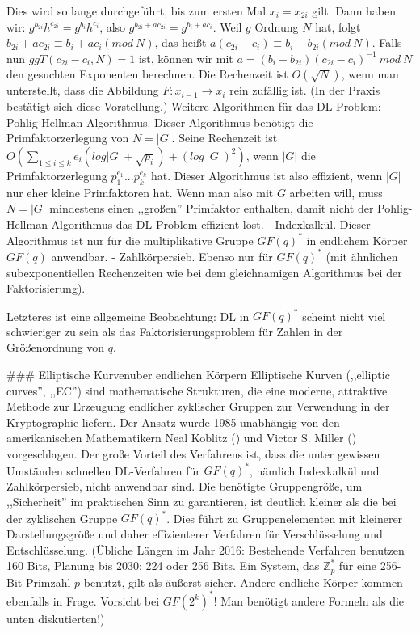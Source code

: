 \documentclass[a4paper]{article}
\begin{document}
\begin{multicols}{3}
{{{{Dies wird so lange durchgeführt, bis zum ersten Mal $x_i=x_{2i}$ gilt. Dann haben wir: $g^{b_{2i}} h^{c_{2i}}=g^{b_i} h^{c_i}$, also $g^{b_{2i}+ac_{2i}}=g^{b_i+ac_i}$. Weil $g$ Ordnung $N$ hat, folgt $b_{2i} +ac_{2i}\equiv b_i+ac_i (mod\ N)$, das heißt $a(c_{2i}-c_i)\equiv b_i-b_{2i} (mod\ N)$.
Falls nun $ggT(c_{2i}-c_i,N) = 1$ ist, können wir mit $a= (b_i-b_{2i})(c_{2i}-c_i)^{-1}\ mod\ N$ den gesuchten Exponenten berechnen.
Die Rechenzeit ist $O(\sqrt{N})$, wenn man unterstellt, dass die Abbildung $F:x_{i-1}\rightarrow x_i$ rein zufällig ist. (In der Praxis bestätigt sich diese Vorstellung.) 
Weitere Algorithmen für das DL-Problem:
- Pohlig-Hellman-Algorithmus. Dieser Algorithmus benötigt die Primfaktorzerlegung von $N=|G|$. Seine Rechenzeit ist $O(\sum_{1 \leq i\leq k} e_i(log|G|+\sqrt{p_i}) + (log\ |G|)^2)$, wenn $|G|$ die Primfaktorzerlegung $p^{e_1}_1... p^{e_k}_k$ hat. Dieser Algorithmus ist also effizient, wenn $|G|$ nur eher kleine Primfaktoren hat. Wenn man also mit $G$ arbeiten will, muss $N=|G|$ mindestens einen ,,großen'' Primfaktor enthalten, damit nicht der Pohlig-Hellman-Algorithmus das DL-Problem effizient löst.
- Indexkalkül. Dieser Algorithmus ist nur für die multiplikative Gruppe $GF(q)^*$ in endlichem Körper $GF(q)$ anwendbar.
- Zahlkörpersieb. Ebenso nur für $GF(q)^*$ (mit ähnlichen subexponentiellen Rechenzeiten wie bei dem gleichnamigen Algorithmus bei der Faktorisierung). 

Letzteres ist eine allgemeine Beobachtung: DL in $GF(q)^*$ scheint nicht viel schwieriger zu sein als das Faktorisierungsproblem für Zahlen in der Größenordnung von $q$.

### Elliptische Kurvenuber endlichen Körpern
Elliptische Kurven (,,elliptic curves'', ,,EC'') sind mathematische Strukturen, die eine moderne, attraktive Methode zur Erzeugung endlicher zyklischer Gruppen zur Verwendung in der Kryptographie liefern. Der Ansatz wurde 1985 unabhängig von den amerikanischen Mathematikern Neal Koblitz () und Victor S. Miller () vorgeschlagen. Der große Vorteil des Verfahrens ist, dass die unter gewissen Umständen schnellen DL-Verfahren für $GF(q)^*$, nämlich Indexkalkül und Zahlkörpersieb, nicht anwendbar sind. Die benötigte Gruppengröße, um ,,Sicherheit'' im praktischen Sinn zu garantieren, ist deutlich kleiner als die bei der zyklischen Gruppe $GF(q)^*$. Dies führt zu Gruppenelementen mit kleinerer Darstellungsgröße und daher effizienterer Verfahren für Verschlüsselung und Entschlüsselung. 
(Übliche Längen im Jahr 2016: Bestehende Verfahren benutzen 160 Bits, Planung bis 2030: 224 oder 256 Bits. Ein System, das $\mathbb{Z}^*_p$ für eine 256-Bit-Primzahl $p$ benutzt, gilt als äußerst sicher. Andere endliche Körper kommen ebenfalls in Frage. Vorsicht bei $GF(2^k)^*$! Man benötigt andere Formeln als die unten diskutierten!)

}}}}
\end{multicols}
\end{document}
